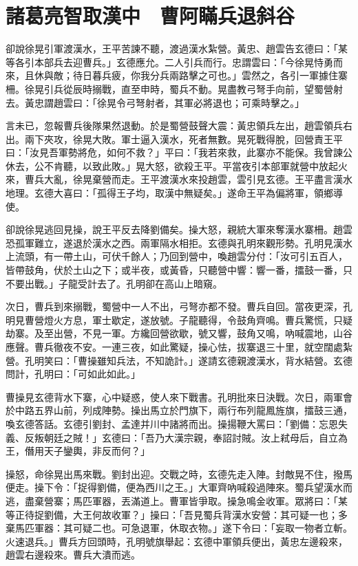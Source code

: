 
\chapter{諸葛亮智取漢中　曹阿瞞兵退斜谷}

卻說徐晃引軍渡漢水，王平苦諫不聽，渡過漢水紮營。黃忠、趙雲告玄德曰：「某等各引本部兵去迎曹兵。」玄德應允。二人引兵而行。忠謂雲曰：「今徐晃恃勇而來，且休與敵；待日暮兵疲，你我分兵兩路擊之可也。」雲然之，各引一軍據住寨柵。徐晃引兵從辰時搦戰，直至申時，蜀兵不動。晃盡教弓弩手向前，望蜀營射去。黃忠謂趙雲曰：「徐晃令弓弩射者，其軍必將退也；可乘時擊之。」

言未已，忽報曹兵後隊果然退動。於是蜀營鼓聲大震：黃忠領兵左出，趙雲領兵右出。兩下夾攻，徐晃大敗。軍士逼入漢水，死者無數。晃死戰得脫，回營責王平曰：「汝見吾軍勢將危，如何不救？」平曰：「我若來救，此寨亦不能保。我曾諫公休去，公不肯聽，以致此敗。」晃大怒，欲殺王平。平當夜引本部軍就營中放起火來，曹兵大亂，徐晃棄營而走。王平渡漢水來投趙雲，雲引見玄德。王平盡言漢水地理。玄德大喜曰：「孤得王子均，取漢中無疑矣。」遂命王平為偏將軍，領鄉導使。

卻說徐晃逃回見操，說王平反去降劉備矣。操大怒，親統大軍來奪漢水寨柵。趙雲恐孤軍難立，遂退於漢水之西。兩軍隔水相拒。玄德與孔明來觀形勢。孔明見漢水上流頭，有一帶土山，可伏千餘人；乃回到營中，喚趙雲分付：「汝可引五百人，皆帶鼓角，伏於土山之下；或半夜，或黃昏，只聽營中響：響一番，擂鼓一番，只不要出戰。」子龍受計去了。孔明卻在高山上暗窺。

次日，曹兵到來搦戰，蜀營中一人不出，弓弩亦都不發。曹兵自回。當夜更深，孔明見曹營燈火方息，軍士歇定，遂放號。子龍聽得，令鼓角齊鳴。曹兵驚慌，只疑劫寨。及至出營，不見一軍。方纔回營欲歇，號又響，鼓角又鳴，吶喊震地，山谷應聲。曹兵徹夜不安。一連三夜，如此驚疑，操心怯，拔寨退三十里，就空闊處紮營。孔明笑曰：「曹操雖知兵法，不知詭計。」遂請玄德親渡漢水，背水結營。玄德問計，孔明曰：「可如此如此。」

曹操見玄德背水下寨，心中疑惑，使人來下戰書。孔明批來日決戰。次日，兩軍會於中路五界山前，列成陣勢。操出馬立於門旗下，兩行布列龍鳳旌旗，擂鼓三通，喚玄德答話。玄德引劉封、孟達并川中諸將而出。操揚鞭大罵曰：「劉備：忘恩失義、反叛朝廷之賊！」玄德曰：「吾乃大漢宗親，奉詔討賊。汝上弒母后，自立為王，僭用天子鑾輿，非反而何？」

操怒，命徐晃出馬來戰。劉封出迎。交戰之時，玄德先走入陣。封敵晃不住，撥馬便走。操下令：「捉得劉備，便為西川之王。」大軍齊吶喊殺過陣來。蜀兵望漢水而逃，盡棄營寨；馬匹軍器，丟滿道上。曹軍皆爭取。操急鳴金收軍。眾將曰：「某等正待捉劉備，大王何故收軍？」操曰：「吾見蜀兵背漢水安營：其可疑一也；多棄馬匹軍器：其可疑二也。可急退軍，休取衣物。」遂下令曰：「妄取一物者立斬。火速退兵。」曹兵方回頭時，孔明號旗舉起：玄德中軍領兵便出，黃忠左邊殺來，趙雲右邊殺來。曹兵大潰而逃。

